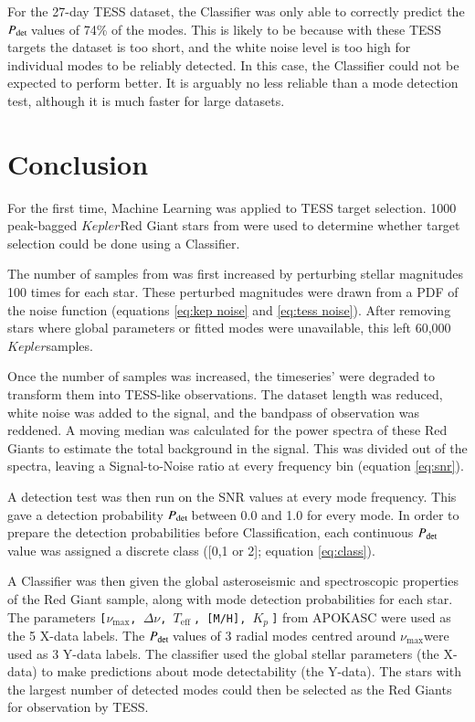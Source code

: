 \documentclass[a4paper,fleqn,usenatbib,useAMS]{mnras}
\newcommand{\numax}{\ensuremath{\nu_{\textrm{max}}}}
\newcommand{\dnu}{\ensuremath{\Delta\nu}}
\newcommand{\teff}{\ensuremath{T_{\textrm{eff}}\:}}
\newcommand{\kep}{\ensuremath{Kepler}\:}
\newcommand{\pdet}{\ensuremath{P_{\rm det}\:}}
\newcommand{\kp}{\ensuremath{K_{p}\:}}
\begin{document}
For the 27-day TESS dataset, the Classifier was only able to correctly predict the \pdet values of 74\% of the modes. This is likely to be because with these TESS targets the dataset is too short, and the white noise level is too high for individual modes to be reliably detected. In this case, the Classifier could not be expected to perform better. It is arguably no less reliable than a mode detection test, although it is much faster for large datasets. 




\section{Conclusion}
\label{sect: conc}

For the first time, Machine Learning was applied to TESS target selection. 1000 peak-bagged \kep Red Giant stars from \citet{davies_asteroseismology_2016} were used to determine whether target selection could be done using a Classifier.

The number of samples from \citet{davies_asteroseismology_2016} was first increased by perturbing stellar magnitudes 100 times for each star. These perturbed magnitudes were drawn from a PDF of the noise function (equations \ref{eq:kep noise} and \ref{eq:tess noise}). After removing stars where global parameters or fitted modes were unavailable, this left 60,000 \kep samples. 

Once the number of samples was increased, the timeseries' were degraded to transform them into TESS-like observations. The dataset length was reduced, white noise was added to the signal, and the bandpass of observation was reddened. A moving median was calculated for the power spectra of these Red Giants to estimate the total background in the signal. This was divided out of the spectra, leaving a Signal-to-Noise ratio at every frequency bin (equation \ref{eq:snr}).

A detection test was then run on the SNR values at every mode frequency. This gave a detection probability \pdet between 0.0 and 1.0 for every mode. In order to prepare the detection probabilities before Classification, each continuous \pdet value was assigned a discrete class ([0,1 or 2]; equation \ref{eq:class}).

A Classifier was then given the global asteroseismic and spectroscopic properties of the Red Giant sample, along with mode detection probabilities for each star. The parameters \texttt{[\numax, \dnu, \teff, [M/H], \kp]} from APOKASC \citep{pinsonneault_apokasc_2014} were used as the 5 X-data labels. The \pdet values of 3 radial modes centred around \numax were used as 3 Y-data labels. %
The classifier used the global stellar parameters (the X-data) to make predictions about mode detectability (the Y-data). The stars with the largest number of detected modes could then be selected as the Red Giants for observation by TESS. 
\end{document}
